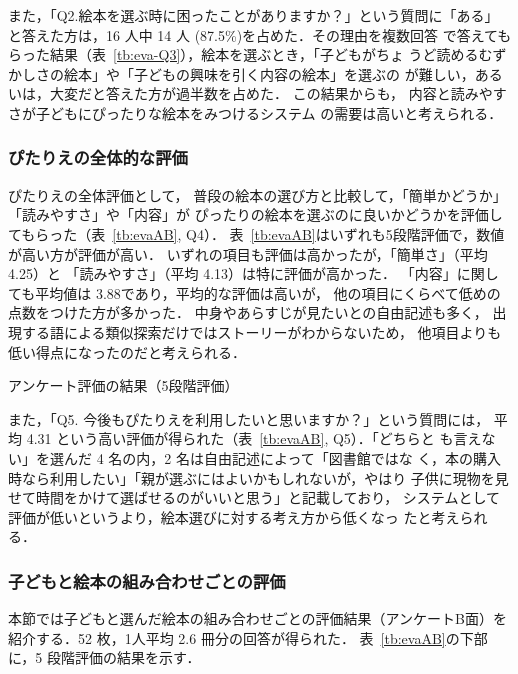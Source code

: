 \documentclass[japanese]{jnlp_1.4}
\begin{document}
また，「Q2.絵本を選ぶ時に困ったことがありますか？」という質問に「ある」
と答えた方は，16 人中 14 人 (87.5\%)を占めた．その理由を複数回答
で答えてもらった結果（表~\ref{tb:eva-Q3}），絵本を選ぶとき，「子どもがちょ
うど読めるむずかしさの絵本」や「子どもの興味を引く内容の絵本」を選ぶの
が難しい，あるいは，大変だと答えた方が過半数を占めた．
この結果からも，
内容と読みやすさが子どもにぴったりな絵本をみつけるシステム
の需要は高いと考えられる．



\subsubsection{ぴたりえの全体的な評価}
\label{sec:qa-total}

ぴたりえの全体評価として，
普段の絵本の選び方と比較して，「簡単かどうか」「読みやすさ」や「内容」が
ぴったりの絵本を選ぶのに良いかどうかを評価してもらった（表~\ref{tb:evaAB}, Q4）．
表~\ref{tb:evaAB}はいずれも5段階評価で，数値が高い方が評価が高い．
いずれの項目も評価は高かったが，「簡単さ」（平均 4.25）と
「読みやすさ」（平均 4.13）は特に評価が高かった．
「内容」に関しても平均値は 3.88であり，平均的な評価は高いが，
他の項目にくらべて低めの点数をつけた方が多かった．
中身やあらすじが見たいとの自由記述も多く，
出現する語による類似探索だけではストーリーがわからないため，
他項目よりも低い得点になったのだと考えられる．

\begin{table}[b]
\caption{アンケート評価の結果（5段階評価）}
\label{tb:evaAB}

\end{table}

また，「Q5. 今後もぴたりえを利用したいと思いますか？」という質問には，
平均 4.31 という高い評価が得られた（表~\ref{tb:evaAB}, Q5）．「どちらと
も言えない」を選んだ 4 名の内，2 名は自由記述によって「図書館ではな
く，本の購入時なら利用したい」「親が選ぶにはよいかもしれないが，やはり
子供に現物を見せて時間をかけて選ばせるのがいいと思う」と記載しており，
システムとして評価が低いというより，絵本選びに対する考え方から低くなっ
たと考えられる．


\subsubsection{子どもと絵本の組み合わせごとの評価}
\label{sec:qa-each}

本節では子どもと選んだ絵本の組み合わせごとの評価結果（アンケートB面）を
紹介する．52 枚，1人平均 2.6 冊分の回答が得られた．
表~\ref{tb:evaAB}の下部に，5 段階評価の結果を示す．
\end{document}
